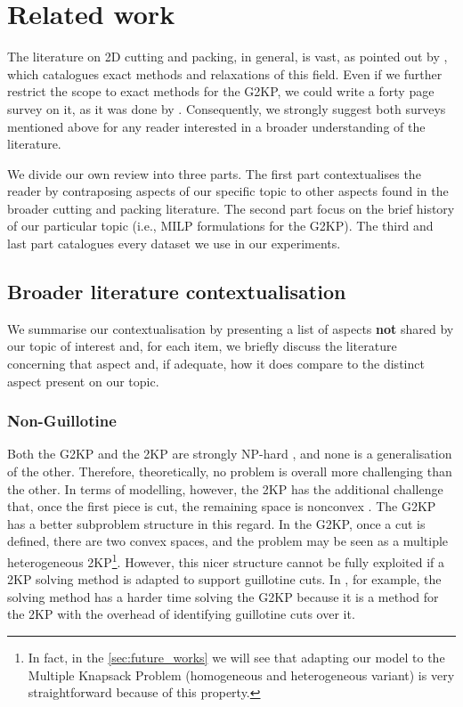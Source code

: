 \documentclass[ppgc,prop-tese,english,formais,babel]{iiufrgs}
\begin{document}
\chapter{Related work}
\label{sec:related_work}

The literature on 2D cutting and packing, in general, is vast, as pointed out by \citet{iori:2020}, which catalogues exact methods and relaxations of this field.
Even if we further restrict the scope to exact methods for the G2KP, we could write a forty page survey on it, as it was done by \citet{russo:2020}.
Consequently, we strongly suggest both surveys mentioned above for any reader interested in a broader understanding of the literature.

We divide our own review into three parts. The first part contextualises the reader by contraposing aspects of our specific topic to other aspects found in the broader cutting and packing literature. The second part focus on the brief history of our particular topic (i.e., MILP formulations for the G2KP). The third and last part catalogues every dataset we use in our experiments.

\section{Broader literature contextualisation}

We summarise our contextualisation by presenting a list of aspects \textbf{not} shared by our topic of interest and, for each item, we briefly discuss the literature concerning that aspect and, if adequate, how it does compare to the distinct aspect present on our topic.

\subsection{Non-Guillotine}

Both the G2KP and the 2KP are strongly NP-hard \citep{iori:2020}, and none is a generalisation of the other.
Therefore, theoretically, no problem is overall more challenging than the other.
In terms of modelling, however, the 2KP has the additional challenge that, once the first piece is cut, the remaining space is nonconvex \citep{fekete:1997}.
The G2KP has a better subproblem structure in this regard.
In the G2KP, once a cut is defined, there are two convex spaces, and the problem may be seen as a multiple heterogeneous 2KP\footnote{In fact, in the \cref{sec:future_works} we will see that adapting our model to the Multiple Knapsack Problem (homogeneous and heterogeneous variant) is very straightforward because of this property.}.
However, this nicer structure cannot be fully exploited if a 2KP solving method is adapted to support guillotine cuts.
In \citet{nascimento:2019}, for example, the solving method has a harder time solving the G2KP because it is a method for the 2KP with the overhead of identifying guillotine cuts over it.
\end{document}
